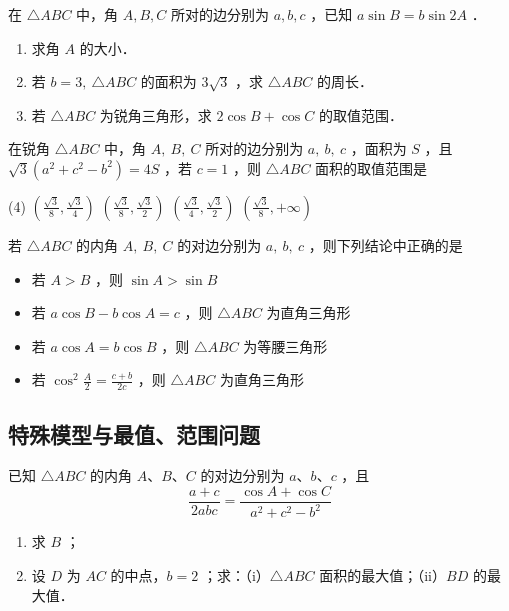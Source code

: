 \begin{example}
    在 $\triangle A B C$ 中，角 $A, B, C$ 所对的边分别为 $a, b, c$ ，已知 $a \sin B=b \sin 2 A$ ．
    \begin{enumerate}
        \item 求角 $A$ 的大小．
        \item 若 $b=3, ~ \triangle A B C$ 的面积为 $3 \sqrt{3}$ ，求 $\triangle A B C$ 的周长．
        \item 若 $\triangle A B C$ 为锐角三角形，求 $2 \cos B+\cos C$ 的取值范围．
    \end{enumerate}
\end{example}
\vspace{4em}

\begin{example}
    在锐角 $\triangle A B C$ 中，角 $A, ~ B, ~ C$ 所对的边分别为 $a, ~ b, ~ c$ ，面积为 $S$ ，且 $\sqrt{3}\left(a^2+c^2-b^2\right)=4 S$ ，若 $c=1$ ，则 $\triangle A B C$ 面积的取值范围是
    \begin{tasks}(4)
        \task $\left(\frac{\sqrt{3}}{8}, \frac{\sqrt{3}}{4}\right)$
        \task $\left(\frac{\sqrt{3}}{8}, \frac{\sqrt{3}}{2}\right)$
        \task $\left(\frac{\sqrt{3}}{4}, \frac{\sqrt{3}}{2}\right)$
        \task $\left(\frac{\sqrt{3}}{8},+\infty\right)$
    \end{tasks}
\end{example}
\vspace{4em}

\begin{example}
    若 $\triangle A B C$ 的内角 $A, ~ B, ~ C$ 的对边分别为 $a, ~ b, ~ c$ ，则下列结论中正确的是
    \begin{itemize}
        \item 若 $A>B$ ，则 $\sin A>\sin B$
        \item 若 $a \cos B-b \cos A=c$ ，则 $\triangle A B C$ 为直角三角形
        \item 若 $a \cos A=b \cos B$ ，则 $\triangle A B C$ 为等腰三角形
        \item 若 $\cos ^2 \frac{A}{2}=\frac{c+b}{2 c}$ ，则 $\triangle A B C$ 为直角三角形
    \end{itemize}
\end{example}

\vspace{4em}

\subsection{特殊模型与最值、范围问题}

\begin{example}
    已知 $\triangle A B C$ 的内角 $A 、 B 、 C$ 的对边分别为 $a 、 b 、 c$ ，且
    $$
        \frac{a+c}{2 a b c}=\frac{\cos A+\cos C}{a^2+c^2-b^2}
    $$
    \begin{enumerate}
        \item 求 $B$ ；
        \item 设 $D$ 为 $A C$ 的中点，$b=2$ ；求：（i）$\triangle A B C$ 面积的最大值；（ii）$B D$ 的最大值．
    \end{enumerate}
\end{example}

\vspace{2em}

